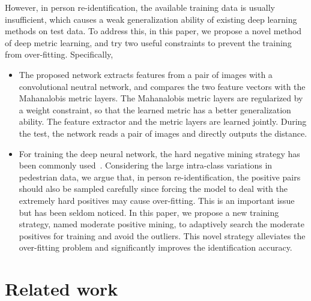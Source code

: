 \documentclass[10pt,twocolumn,letterpaper]{article}
\begin{document}
However, in person re-identification, the available training data is usually insufficient, which causes a weak generalization ability of existing deep learning methods on test data. To address this, in this paper, we propose a novel method of deep metric learning, and try two useful constraints to prevent the training from over-fitting. Specifically,
\begin{itemize}\itemsep=-1pt
    \item The proposed network extracts features from a pair of images with a convolutional neutral network, and compares the two feature vectors with the Mahanalobis metric layers.
    The Mahanalobis metric layers are regularized by a weight constraint, so that the learned metric has a better generalization ability.
    The feature extractor and the metric layers are learned jointly.
    During the test, the network reads a pair of images and directly outputs the distance.
    \item For training the deep neural network, the hard negative mining strategy has been commonly used~\cite{ahmed2015improved, parkhi2015deep, schroff2015facenet}.
    Considering the large intra-class variations in pedestrian data, we argue that, in person re-identification,
    the positive pairs should also be sampled carefully since forcing the model to deal with the extremely hard positives may cause over-fitting.
    This is an important issue but has been seldom noticed.
    In this paper, we propose a new training strategy, named moderate positive mining, to adaptively search the moderate positives for training and avoid the outliers.
    This novel strategy alleviates the over-fitting problem and significantly improves the identification accuracy.
\end{itemize}








\section{Related work}
\label{section_Related_work}
\end{document}
